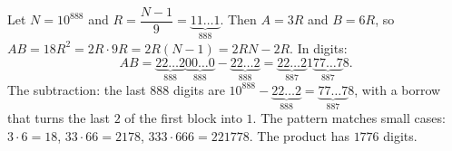Let $N=10^{888}$ and $R=\dfrac{N-1}{9}=\underbrace{11\ldots1}_{888}$. Then $A=3R$ and $B=6R$, so $AB=18R^2=2R\cdot9R=2R(N-1)=2RN-2R$. In digits:
\[
AB=\underbrace{22\ldots2}_{888}\underbrace{00\ldots0}_{888}-\underbrace{22\ldots2}_{888}=\boxed{\underbrace{22\ldots2}_{887}1\underbrace{77\ldots7}_{887}8}.
\]
The subtraction: the last $888$ digits are $10^{888}-\underbrace{22\ldots2}_{888}=\underbrace{77\ldots7}_{887}8$, with a borrow that turns the last $2$ of the first block into $1$. The pattern matches small cases: $3\cdot6=18$, $33\cdot66=2178$, $333\cdot666=221778$. The product has $1776$ digits.
